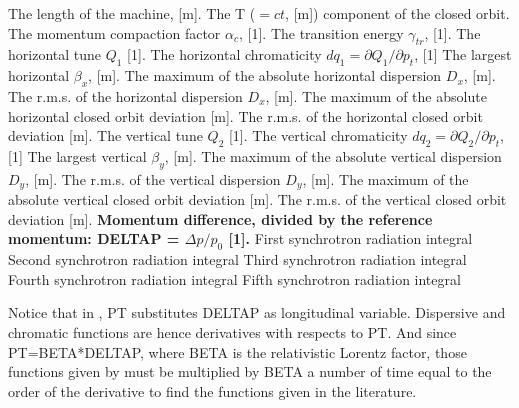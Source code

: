 \begin{5.02.06}
\begin{madlist}
	 The length of the machine, [m].     
	 The T ($= c t$, [m]) component of the closed orbit.     
	 The momentum compaction factor $\alpha_c$, [1].     
	 The transition energy $\gamma_{tr}$, [1].     
	 The horizontal tune $Q_1$ [1].     
	 The horizontal chromaticity $dq_1 = \partial Q_1 / \partial p_t$, [1]
	 The largest horizontal $\beta_x$, [m].     
	 The maximum of the absolute horizontal dispersion $D_x$, [m].     
	 The r.m.s. of the horizontal dispersion $D_x$, [m].     
	 The maximum of the absolute horizontal closed orbit deviation [m].     
	 The r.m.s. of the horizontal closed orbit deviation [m].     
	 The vertical tune $Q_2$ [1].     
	 The vertical chromaticity $dq_2 = \partial Q_2 / \partial p_t$, [1]
	 The largest vertical $\beta_y$, [m].     
	 The maximum of the absolute vertical dispersion $D_y$, [m].     
	 The r.m.s. of the vertical dispersion $D_y$, [m].     
	 The maximum of the absolute vertical closed orbit deviation [m].     
	 The r.m.s. of the vertical closed orbit deviation [m].     
	 {\bf Momentum difference, divided by the reference
	momentum: DELTAP = $\Delta p / p_0$ [1].}
	 First synchrotron radiation integral  
	 Second synchrotron radiation integral  
	 Third synchrotron radiation integral  
	 Fourth synchrotron radiation integral  
	 Fifth synchrotron radiation integral  
\end{madlist}
\end{5.02.06}

Notice that in \madx, PT substitutes DELTAP as longitudinal
variable. Dispersive and chromatic functions are hence derivatives with
respects to PT.
And since PT=BETA*DELTAP, where BETA is the relativistic Lorentz 
factor, those functions given by \madx must be multiplied by BETA a
number of time equal to the order of the derivative to find the
functions given in the literature. 

